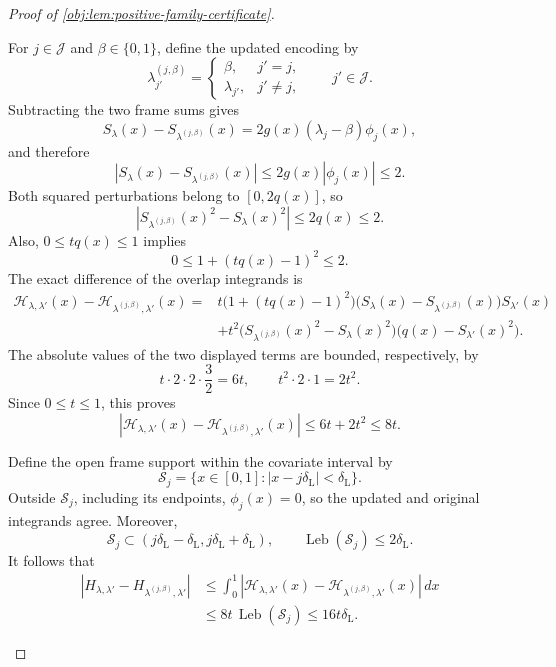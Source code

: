 \documentclass[11pt]{article}
\begin{document}
\begin{proof}[Proof of \cref{obj:lem:positive-family-certificate}]
\begin{enumerate}
For \(j\in\mathcal J\) and \(\beta\in\{0,1\}\), define the updated
encoding by
\[
\lambda^{(j,\beta)}_{j'}=
\begin{cases}
\beta,&j'=j,\\
\lambda_{j'},&j'\ne j,
\end{cases}
\qquad j'\in\mathcal J.
\]
Subtracting the two frame sums gives
\[
S_\lambda(x)-S_{\lambda^{(j,\beta)}}(x)
=2g(x)(\lambda_j-\beta)\phi_j(x),
\]
and therefore
\[
|S_\lambda(x)-S_{\lambda^{(j,\beta)}}(x)|
\le2g(x)|\phi_j(x)|\le2.
\]
Both squared perturbations belong to \([0,2q(x)]\), so
\[
\left|S_{\lambda^{(j,\beta)}}(x)^2-S_\lambda(x)^2\right|
\le2q(x)\le2.
\]
Also, \(0\le tq(x)\le1\) implies
\[
0\le1+(tq(x)-1)^2\le2.
\]
The exact difference of the overlap integrands is
\[
\begin{aligned}
\mathcal H_{\lambda,\lambda'}(x)
-\mathcal H_{\lambda^{(j,\beta)},\lambda'}(x)
={}&t\bigl(1+(tq(x)-1)^2\bigr)
   \bigl(S_\lambda(x)-S_{\lambda^{(j,\beta)}}(x)\bigr)
   S_{\lambda'}(x)\\
&+t^2\bigl(S_{\lambda^{(j,\beta)}}(x)^2-S_\lambda(x)^2\bigr)
       \bigl(q(x)-S_{\lambda'}(x)^2\bigr).
\end{aligned}
\]
The absolute values of the two displayed terms are bounded, respectively,
by
\[
t\cdot2\cdot2\cdot\frac32=6t,
\qquad
t^2\cdot2\cdot1=2t^2.
\]
Since \(0\le t\le1\), this proves
\[
\left|\mathcal H_{\lambda,\lambda'}(x)
-\mathcal H_{\lambda^{(j,\beta)},\lambda'}(x)\right|
\le6t+2t^2\le8t.
\]

Define the open frame support within the covariate interval by
\[
\mathcal S_j=\{x\in[0,1]:|x-j\delta_{\mathrm L}|
                                      <\delta_{\mathrm L}\}.
\]
Outside \(\mathcal S_j\), including its endpoints,
\(\phi_j(x)=0\), so the updated and original integrands agree.
Moreover,
\[
\mathcal S_j\subset
(j\delta_{\mathrm L}-\delta_{\mathrm L},
 j\delta_{\mathrm L}+\delta_{\mathrm L}),
\qquad
\operatorname{Leb}(\mathcal S_j)\le2\delta_{\mathrm L}.
\]
It follows that
\[
\begin{aligned}
|H_{\lambda,\lambda'}-H_{\lambda^{(j,\beta)},\lambda'}|
&\le\int_0^1
 \left|\mathcal H_{\lambda,\lambda'}(x)
       -\mathcal H_{\lambda^{(j,\beta)},\lambda'}(x)\right|\,dx\\
&\le8t\,\operatorname{Leb}(\mathcal S_j)
\le16t\delta_{\mathrm L}.
\end{aligned}
\]


\end{enumerate}
\end{proof}
\end{document}
